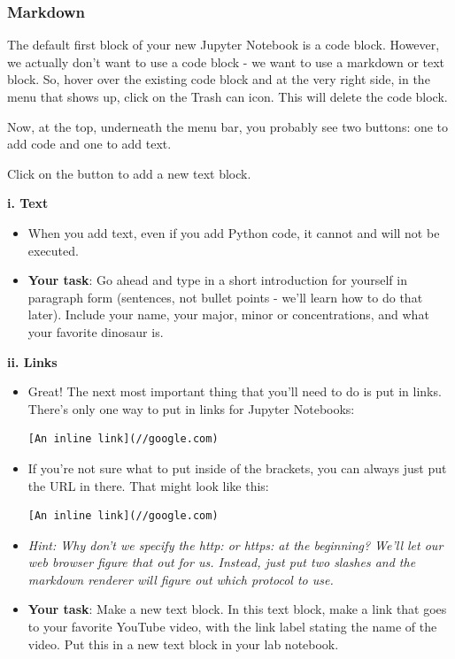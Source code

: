 \subsubsection*{Markdown}
The default first block of your new Jupyter Notebook is a code block. However, we actually don't want to use a code block - we want to use a markdown or text block. So, hover over the existing code block and at the very right side, in the menu that shows up, click on the Trash can icon. This will delete the code block.\par
Now, at the top, underneath the menu bar, you probably see two buttons: one to add code and one to add text.\par
Click on the button to add a new text block.\par
\textbf{i. Text}
\begin{itemize}
	\item When you add text, even if you add Python code, it cannot and will not be executed.
	\item \textbf{Your task}: Go ahead and type in a short introduction for yourself in paragraph form (sentences, not bullet points - we'll learn how to do that later). Include your name, your major, minor or concentrations, and what your favorite dinosaur is.
\end{itemize}
\textbf{ii. Links}
\begin{itemize}
	\item Great! The next most important thing that you'll need to do is put in links. There's only one way to put in links for Jupyter Notebooks:\\
	\begin{lstlisting}[style=none]
[An inline link](//google.com)
	\end{lstlisting}
	\item If you're not sure what to put inside of the brackets, you can always just put the URL in there. That might look like this:\\
	\begin{lstlisting}[style=none]
[An inline link](//google.com)
	\end{lstlisting}
	\item \textit{Hint: Why don't we specify the http: or https: at the beginning? We'll let our web browser figure that out for us. Instead, just put two slashes and the markdown renderer will figure out which protocol to use.}
	\item \textbf{Your task}: Make a new text block. In this text block, make a link that goes to your favorite YouTube video, with the link label stating the name of the video. Put this in a new text block in your lab notebook.
\end{itemize}
